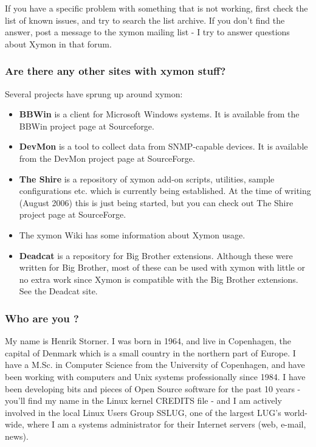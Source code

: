  If you have a specific problem with something that is not working, first check the list of known issues, and try to search the list archive. If you don't find the answer, post a message to the xymon mailing list - I try to answer questions about Xymon in that forum.
\subsubsection{Are there any other sites with xymon stuff?}


 Several projects have sprung up around xymon:
\begin{itemize}
\item \textbf{BBWin}
 is a client for Microsoft Windows systems. It is available from the BBWin project page at Sourceforge.
\item \textbf{DevMon}
 is a tool to collect data from SNMP-capable devices. It is available from the DevMon project page at SourceForge.
\item \textbf{The Shire}
 is a repository of xymon add-on scripts, utilities, sample configurations etc. which is currently being established. At the time of writing (August 2006) this is just being started, but you can check out The Shire project page at SourceForge.
\item The xymon Wiki has some information about Xymon usage.
\item \textbf{Deadcat}
 is a repository for Big Brother extensions. Although these were written for Big Brother, most of these can be used with xymon with little or no extra work since Xymon is compatible with the Big Brother extensions. See the Deadcat site.

\end{itemize}
\subsubsection{Who are you ?}


 My name is Henrik Storner. I was born in 1964, and live in Copenhagen, the capital of Denmark which is a small country in the northern part of Europe. I have a M.Sc. in Computer Science from the University of Copenhagen, and have been working with computers and Unix systems professionally since 1984. I have been developing bits and pieces of Open Source software for the past 10 years - you'll find my name in the Linux kernel CREDITS file - and I am actively involved in the local Linux Users Group SSLUG, one of the largest LUG's world-wide, where I am a systems administrator for their Internet servers (web, e-mail, news).


